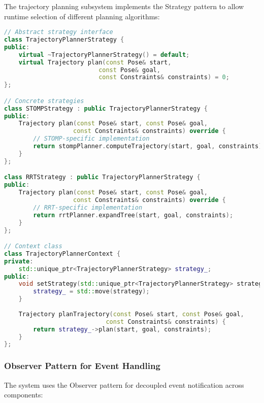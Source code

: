 The trajectory planning subsystem implements the Strategy pattern to allow runtime selection of different planning algorithms:

\begin{lstlisting}[language=C++, caption=Strategy Pattern Implementation]
// Abstract strategy interface
class TrajectoryPlannerStrategy {
public:
    virtual ~TrajectoryPlannerStrategy() = default;
    virtual Trajectory plan(const Pose& start, 
                          const Pose& goal, 
                          const Constraints& constraints) = 0;
};

// Concrete strategies
class STOMPStrategy : public TrajectoryPlannerStrategy {
public:
    Trajectory plan(const Pose& start, const Pose& goal, 
                   const Constraints& constraints) override {
        // STOMP-specific implementation
        return stompPlanner.computeTrajectory(start, goal, constraints);
    }
};

class RRTStrategy : public TrajectoryPlannerStrategy {
public:
    Trajectory plan(const Pose& start, const Pose& goal, 
                   const Constraints& constraints) override {
        // RRT-specific implementation
        return rrtPlanner.expandTree(start, goal, constraints);
    }
};

// Context class
class TrajectoryPlannerContext {
private:
    std::unique_ptr<TrajectoryPlannerStrategy> strategy_;
public:
    void setStrategy(std::unique_ptr<TrajectoryPlannerStrategy> strategy) {
        strategy_ = std::move(strategy);
    }
    
    Trajectory planTrajectory(const Pose& start, const Pose& goal, 
                            const Constraints& constraints) {
        return strategy_->plan(start, goal, constraints);
    }
};
\end{lstlisting}

\subsubsection{Observer Pattern for Event Handling}

The system uses the Observer pattern for decoupled event notification across components:

